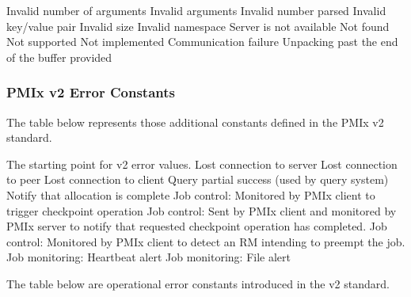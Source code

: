 \begin{constantdesc}
Invalid number of arguments
%
Invalid arguments
%
Invalid number parsed
%
Invalid key/value pair
%
Invalid size
%
Invalid namespace
%
Server is not available
%
Not found
%
Not supported
%
Not implemented
%
Communication failure
%
Unpacking past the end of the buffer provided
%
\end{constantdesc}

\subsubsection{PMIx v2 Error Constants}

The table below represents those additional constants defined in the PMIx v2 standard.

\begin{constantdesc}
%
The starting point for v2 error values.
%
Lost connection to server
%
Lost connection to peer
%
Lost connection to client
%
Query partial success (used by query system)
%
Notify that allocation is complete
%
Job control: Monitored by PMIx client to trigger checkpoint operation
%
Job control: Sent by PMIx client and monitored by PMIx server to notify that requested checkpoint operation has completed.
%
Job control: Monitored by PMIx client to detect an \ac{RM} intending to preempt the job.
%
Job monitoring: Heartbeat alert
%
Job monitoring: File alert
%
\end{constantdesc}

The table below are operational error constants introduced in the v2 standard.

